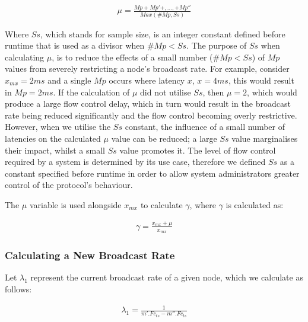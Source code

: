     \begin{equation*}
		     \begin{aligned}
		         \mu = \frac{Mp + Mp'+,\ldots,+ Mp''}{Max(\#Mp, Ss)}
		     \end{aligned}
    \end{equation*} 
    
    Where $Ss$, which stands for sample size, is an integer constant defined before runtime that is used as a divisor when $\#Mp < Ss$.  The purpose of $Ss$ when calculating $\mu$, is to reduce the effects of a small number ($\#Mp < Ss$) of $Mp$ values from severely restricting a node's broadcast rate.  For example, consider  $x_{mx} = 2ms$ and a single $Mp$ occurs where latency $x$, $x = 4ms$, this would result in $Mp = 2ms$.  If the calculation of $\mu$ did not utilise $Ss$, then $\mu = 2$, which would produce a large flow control delay, which in turn would result in the broadcast rate being reduced significantly and the flow control becoming overly restrictive.  However, when we utilise the $Ss$ constant, the influence of a small number of latencies on the calculated $\mu$ value can be reduced; a large $Ss$ value marginalises their impact, whilst a small $Ss$ value promotes it.  The level of flow control required by a system is determined by its use case, therefore we defined $Ss$ as a constant specified before runtime in order to allow system administrators greater control of the protocol's behaviour.  
    
    The $\mu$ variable is used alongside $x_{mx}$ to calculate $\gamma$, where $\gamma$ is calculated as:
    
    \begin{equation*}
		     \begin{aligned}
		         \gamma = \frac{x_{mx} + \mu}{x_{mx}}
		     \end{aligned}
    \end{equation*} 
    
    \subsubsection*{Calculating a New Broadcast Rate}
    Let $\lambda_1$ represent the current broadcast rate of a given node, which we calculate as follows:

    \begin{equation*}
		     \begin{aligned}
		         \lambda_1 = \frac{1}{m'.Fc_{ts} - m''.Fc_{ts}}
		     \end{aligned}
    \end{equation*} 
    
